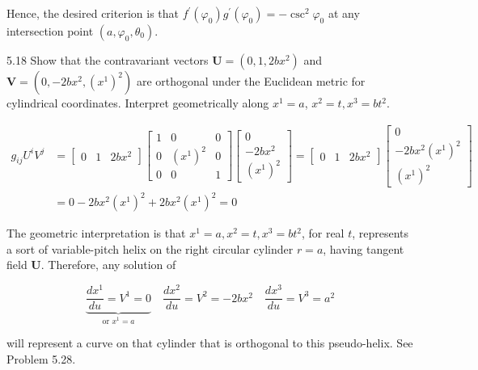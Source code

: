\documentclass[10pt]{article}
\begin{document}
Hence, the desired criterion is that $f^{\prime}\left(\varphi_{0}\right) g^{\prime}\left(\varphi_{0}\right)=-\csc ^{2} \varphi_{0}$ at any intersection point $\left(a, \varphi_{0}, \theta_{0}\right)$.

5.18 Show that the contravariant vectors $\mathbf{U}=\left(0,1,2 b x^{2}\right)$ and $\mathbf{V}=\left(0,-2 b x^{2},\left(x^{1}\right)^{2}\right)$ are orthogonal under the Euclidean metric for cylindrical coordinates. Interpret geometrically along $x^{1}=a$, $x^{2}=t, x^{3}=b t^{2}$.

$$
\begin{aligned}
g_{i j} U^{i} V^{j} & =\left[\begin{array}{lll}
0 & 1 & 2 b x^{2}
\end{array}\right]\left[\begin{array}{ccc}
1 & 0 & 0 \\
0 & \left(x^{1}\right)^{2} & 0 \\
0 & 0 & 1
\end{array}\right]\left[\begin{array}{c}
0 \\
-2 b x^{2} \\
\left(x^{1}\right)^{2}
\end{array}\right]=\left[\begin{array}{lll}
0 & 1 & 2 b x^{2}
\end{array}\right]\left[\begin{array}{c}
0 \\
-2 b x^{2}\left(x^{1}\right)^{2} \\
\left(x^{1}\right)^{2}
\end{array}\right] \\
& =0-2 b x^{2}\left(x^{1}\right)^{2}+2 b x^{2}\left(x^{1}\right)^{2}=0
\end{aligned}
$$

The geometric interpretation is that $x^{1}=a, x^{2}=t, x^{3}=b t^{2}$, for real $t$, represents a sort of variable-pitch helix on the right circular cylinder $r=a$, having tangent field $\mathbf{U}$. Therefore, any solution of


\begin{equation*}
\underbrace{\frac{d x^{1}}{d u}=V^{1}=0}_{\text {or } x^{1}=a} \quad \frac{d x^{2}}{d u}=V^{2}=-2 b x^{2} \quad \frac{d x^{3}}{d u}=V^{3}=a^{2} \tag{1}
\end{equation*}


will represent a curve on that cylinder that is orthogonal to this pseudo-helix. See Problem 5.28.
\end{document}
